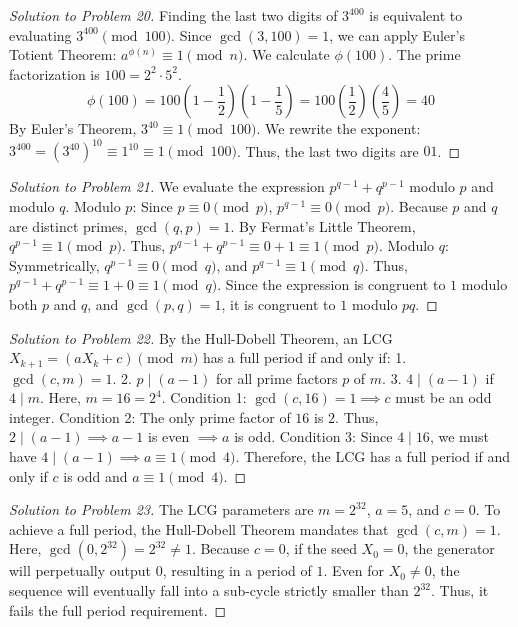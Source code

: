 \documentclass[11pt, a4paper]{article}
\theoremstyle{definition}
\theoremstyle{remark}
\begin{document}
\begin{proof}[Solution to Problem 20]
Finding the last two digits of $3^{400}$ is equivalent to evaluating $3^{400} \pmod{100}$.
Since $\gcd(3, 100) = 1$, we can apply Euler's Totient Theorem: $a^{\phi(n)} \equiv 1 \pmod n$.
We calculate $\phi(100)$. The prime factorization is $100 = 2^2 \cdot 5^2$.
\[ \phi(100) = 100 \left(1 - \frac{1}{2}\right) \left(1 - \frac{1}{5}\right) = 100 \left(\frac{1}{2}\right) \left(\frac{4}{5}\right) = 40 \]
By Euler's Theorem, $3^{40} \equiv 1 \pmod{100}$.
We rewrite the exponent: $3^{400} = (3^{40})^{10} \equiv 1^{10} \equiv 1 \pmod{100}$.
Thus, the last two digits are $01$.
\end{proof}

\begin{proof}[Solution to Problem 21]
We evaluate the expression $p^{q-1} + q^{p-1}$ modulo $p$ and modulo $q$.
Modulo $p$: Since $p \equiv 0 \pmod p$, $p^{q-1} \equiv 0 \pmod p$. Because $p$ and $q$ are distinct primes, $\gcd(q,p)=1$. By Fermat's Little Theorem, $q^{p-1} \equiv 1 \pmod p$. Thus, $p^{q-1} + q^{p-1} \equiv 0 + 1 \equiv 1 \pmod p$.
Modulo $q$: Symmetrically, $q^{p-1} \equiv 0 \pmod q$, and $p^{q-1} \equiv 1 \pmod q$. Thus, $p^{q-1} + q^{p-1} \equiv 1 + 0 \equiv 1 \pmod q$.
Since the expression is congruent to $1$ modulo both $p$ and $q$, and $\gcd(p,q)=1$, it is congruent to $1$ modulo $pq$.
\end{proof}

\begin{proof}[Solution to Problem 22]
By the Hull-Dobell Theorem, an LCG $X_{k+1} = (aX_k + c) \pmod m$ has a full period if and only if:
1. $\gcd(c, m) = 1$.
2. $p \mid (a - 1)$ for all prime factors $p$ of $m$.
3. $4 \mid (a - 1)$ if $4 \mid m$.
Here, $m = 16 = 2^4$.
Condition 1: $\gcd(c, 16) = 1 \implies c$ must be an odd integer.
Condition 2: The only prime factor of $16$ is $2$. Thus, $2 \mid (a - 1) \implies a - 1$ is even $\implies a$ is odd.
Condition 3: Since $4 \mid 16$, we must have $4 \mid (a - 1) \implies a \equiv 1 \pmod 4$.
Therefore, the LCG has a full period if and only if $c$ is odd and $a \equiv 1 \pmod 4$.
\end{proof}

\begin{proof}[Solution to Problem 23]
The LCG parameters are $m = 2^{32}$, $a = 5$, and $c = 0$. 
To achieve a full period, the Hull-Dobell Theorem mandates that $\gcd(c, m) = 1$. 
Here, $\gcd(0, 2^{32}) = 2^{32} \neq 1$. 
Because $c=0$, if the seed $X_0 = 0$, the generator will perpetually output $0$, resulting in a period of $1$. Even for $X_0 \neq 0$, the sequence will eventually fall into a sub-cycle strictly smaller than $2^{32}$. Thus, it fails the full period requirement.
\end{proof}
\end{document}
